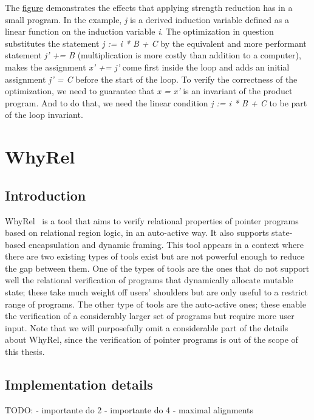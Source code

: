 The \hyperref[fig:induction_var_strength_red]{figure} demonstrates the effects that applying strength reduction has in a small program.
In the example, \emph{j} is a derived induction variable defined as a linear function on the induction variable \emph{i}.
The optimization in question substitutes the statement \emph{j := i * B + C} by the equivalent and more performant statement \emph{j' += B} (multiplication is more costly than addition to a computer), makes the assignment \emph{x' += j'} come first inside the loop and adds an initial assignment \emph{j' = C} before the start of the loop.
To verify the correctness of the optimization, we need to guarantee that \emph{x = x'} is an invariant of the product program.
And to do that, we need the linear condition \emph{j := i * B + C} to be part of the loop invariant.

\FloatBarrier
\section{WhyRel}
\label{sec:whyrel}

\subsection{Introduction}
\label{subsec:whyrel_intro}

WhyRel~\cite{whyrel} is a tool that aims to verify relational properties of pointer programs based on relational region logic, in an auto-active way.
It also supports state-based encapsulation and dynamic framing. 
This tool appears in a context where there are two existing types of tools exist but are not powerful enough to reduce the gap between them.
One of the types of tools are the ones that do not support well the relational verification of programs that dynamically allocate mutable state; these take much weight off users' shoulders but are only useful to a restrict range of programs.
The other type of tools are the auto-active ones; these enable the verification of a considerably larger set of programs but require more user input.
Note that we will purposefully omit a considerable part of the details about WhyRel, since the verification of pointer programs is out of the scope of this thesis.


\subsection{Implementation details}
\label{subsec:whyrel_specifying}
TODO:
- importante do 2
- importante do 4
- maximal alignments

